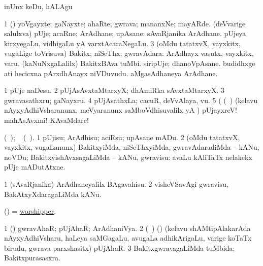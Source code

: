 \noindent
\gl{\akirx}
\expl{}
\bmng
inUnx keDu, hALAgu 
\emng
\eentry

\bentry 
{} 
\gl{\nA}
\expl{}
\bmng
\bnum
\num{1} (\pArxparx) yoVgayxte; gaNayxte; ahaRte; gwrava; mananxNe; mayARde. 
\banum
{} (deVvarige salulxva) pUje; acaRne; ArAdhane; upAsane:  sAvaRjanika ArAdhane. 
 pUjeya kirxyegaLu, vidhigaLu yA varxtAcaraNegaLu. 
\eanum
\numie
\num{3} (oMdu tatatxvX, vayxkitx, \mo vugaLige toVrisuva) Bakitx; niSeThx; gwravAdara:  ArAdhayx vasutx, vayxkitx, \mo varu.  (kaNuNxgaLalilx) BakitxBAva tuMbi.  siripUje; dhanoVpAsane.  budidhxge ati hecicxna pArxdhAnayx niVDuvudu.  aMgasAdhaneya ArAdhane. 
\enum
\emng

\noindent
\gl{\pagu}
\expl{}
\bmng
\bnum
\num{1}  pUje naDesu. 
\num{2}  pUjAsAvxtaMtarxyX; dhAmiRka sAvxtaMtarxyX. 
\num{3}  gwravasathxru; gaNayxru. 
\num{4}  pUjAsathxLa; cacuR, deVvAlaya, \mo vu. 
\num{5}  (    (\kanmu\ \birx) (kelavu nAyxyAdhiVsharanunx, meVyaranunx saMboVdhisuvalilx yA \hA) pUjayxreV! mahAsAvxmi! KAvaMdare! 
\enum
\emng
\eentry

\bentry 
{} 
\gl{\sakirx}
\expl{\eng{[} \BU\ matutx \BUkaq}
  (\ame\ ); \vakaq\  (\ame\ )\eng{]}.\bmng
\bnum
\num{1} pUjisu; ArAdhisu; aciRsu; upAsane mADu. 
\num{2} (oMdu tatatxvX, vayxkitx, \mo vugaLanunx) BakitxyiMda, niSeThxyiMda, gwravAdaradiMda -- kANu, noVDu; BakitxvishAvxsagaLiMda -- kANu, gwravisu:  avaLu kAliTaTx nelakekx pUje mADutAtxne. 
\enum
\emng

\noindent
\gl{\akirx}
\expl{}
\bmng
\bnum
\num{1} (sAvaRjanika) ArAdhaneyalilx BAgavahisu. 
\num{2} visheVSavAgi gwravisu, BakAtxyXdaragaLiMda kANu. 
\enum
\emng
\eentry

\bentry
{} 
\gl{\nA}
\expl{}
\bmng
(\ame) = \hyperlink{worshipper}{worshipper}. 
\emng
\eentry

\bentry
{} 
\gl{\gu}
\expl{}
\bmng
\bnum
\num{1} (\pArxparx) gwravAhaR; pUjAhaR; ArAdhaniVya. 
\num{2} (\sA\ ) (\birx) (kelavu shAMtipAlakarAda nAyxyAdhiVsharu, haLeya saMGagaLu, avugaLa adhikArigaLu, \mo varige koTaTx birudu, gwrava parxshasitx) pUjAhaR. 
\num{3} BakitxgwravagaLiMda tuMbida; Bakitxpurasasxra. 
\enum
\emng
\eentry

